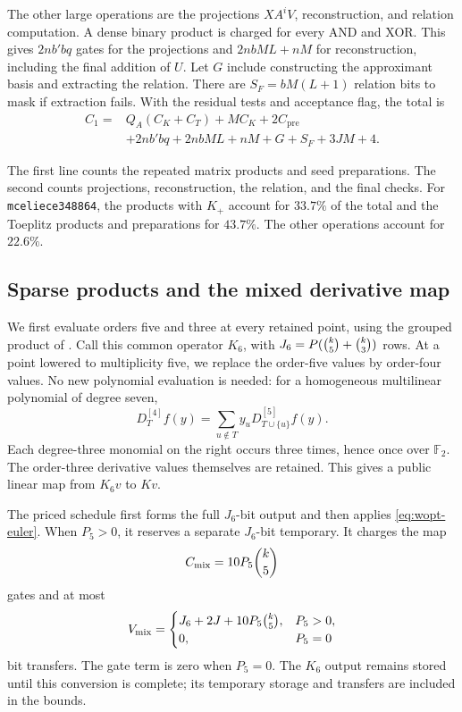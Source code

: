 \documentclass[b5paper, 10pt, abstract=true, captions=tableheading]{scrartcl}
\theoremstyle{plain}
\theoremstyle{definition}
\newcommand{\FF}{\mathds{F}}
\begin{document}
The other large operations are the projections $XA^iV$, reconstruction,
and relation computation. A dense binary product is charged for every
AND and XOR. This gives $2nb'bq$ gates for the projections and
$2nbML+nM$ for reconstruction, including the final addition of $U$.
Let $G$ include constructing the approximant basis and extracting the
relation. There are $S_F=bM(L+1)$ relation bits to mask if extraction
fails. With the residual tests and acceptance flag, the total is
\begin{equation}
 \begin{aligned}
 C_1={}&Q_A(C_K+C_T)+MC_K+2C_{\mathrm{pre}}\\
       &+2nb' bq+2nbML+nM+G+S_F+3JM+4 .
 \end{aligned}
 \label{eq:wopt-totalgates}
\end{equation}

The first line counts the repeated matrix products and seed preparations.
The second counts projections, reconstruction, the relation, and the
final checks. For \texttt{mceliece348864}, the products with $K_+$ account
for $33.7\%$ of the total and the Toeplitz products and preparations for
$43.7\%$. The other operations account for $22.6\%$.

\subsection{Sparse products and the mixed derivative map}
\label{sec:wopt-sparse}
We first evaluate orders five and three at every retained point, using
the grouped product of . Call this common
operator $K_6$, with $J_6=P(\binom{k}{5}+\binom{k}{3})$ rows. At a point lowered to
multiplicity five, we replace the order-five values by order-four values.
No new polynomial evaluation is needed: for a homogeneous multilinear
polynomial of degree seven,
\begin{equation}
 D_T^{[4]}f(y)=\sum_{u\notin T}y_uD_{T\cup\{u\}}^{[5]}f(y).
 \label{eq:wopt-euler}
\end{equation}
Each degree-three monomial on the right occurs three times, hence once
over $\FF_2$. The order-three derivative values themselves are retained.
This gives a public linear map from $K_6v$ to $Kv$.

The priced schedule first forms the full \(J_6\)-bit output and then
applies \eqref{eq:wopt-euler}. When \(P_5>0\), it reserves a separate
\(J_6\)-bit temporary. It charges the map
\[
 C_{\mathrm{mix}}=10P_5\binom{k}{5}
\]
gates and at most
\[
 V_{\mathrm{mix}}=
 \begin{cases}
 J_6+2J+10P_5\binom{k}{5},&P_5>0,\\
 0,&P_5=0
 \end{cases}
\]
bit transfers. The gate term is zero when \(P_5=0\).
The $K_6$ output remains stored until this conversion is complete;
its temporary storage and transfers are included in the bounds.
\end{document}
